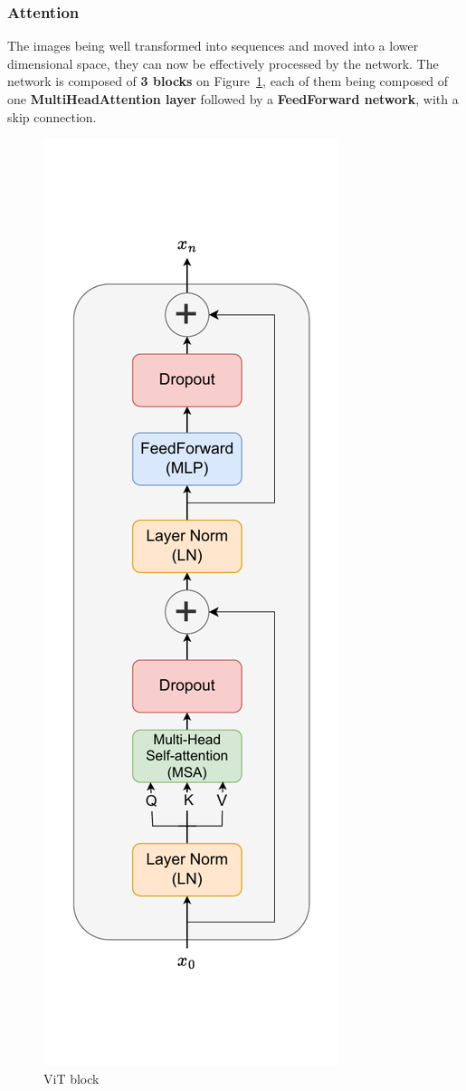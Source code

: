 \documentclass[twocolumn,superscriptaddress,aps]{revtex4-1}
\begin{document}
\subsubsection{Attention}

The images being well transformed into sequences and moved into a lower dimensional space, they can now be effectively processed by the network. The network is composed of \textbf{3 blocks} on Figure~\ref{fig:vit_block}, each of them being composed of one \textbf{MultiHeadAttention layer} followed by a \textbf{FeedForward network}, with a skip connection. \\

\begin{figure}[H]
    \centering
    \includegraphics[width=0.5\linewidth]{images/vit_block.pdf}
    \caption{ViT block}
    \label{fig:vit_block}
\end{figure}
\end{document}
